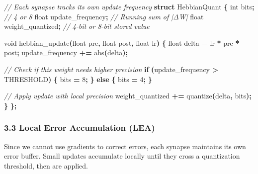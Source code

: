 \documentclass[
  11pt,
  a4paper,
]{article}
\newenvironment{Shaded}{\begin{snugshade}}{\end{snugshade}}
\newcommand{\CommentTok}[1]{\textcolor[rgb]{0.56,0.35,0.01}{\textit{#1}}}
\newcommand{\ControlFlowTok}[1]{\textcolor[rgb]{0.13,0.29,0.53}{\textbf{#1}}}
\newcommand{\DataTypeTok}[1]{\textcolor[rgb]{0.13,0.29,0.53}{#1}}
\newcommand{\DecValTok}[1]{\textcolor[rgb]{0.00,0.00,0.81}{#1}}
\newcommand{\KeywordTok}[1]{\textcolor[rgb]{0.13,0.29,0.53}{\textbf{#1}}}
\newcommand{\NormalTok}[1]{#1}
\newcommand{\OperatorTok}[1]{\textcolor[rgb]{0.81,0.36,0.00}{\textbf{#1}}}
\begin{document}
\begin{Shaded}
\begin{Highlighting}[]
\CommentTok{// Each synapse tracks its own update frequency}
\KeywordTok{struct}\NormalTok{ HebbianQuant }\OperatorTok{\{}
    \DataTypeTok{int}\NormalTok{ bits}\OperatorTok{;}                  \CommentTok{// 4 or 8}
    \DataTypeTok{float}\NormalTok{ update\_frequency}\OperatorTok{;}    \CommentTok{// Running sum of |ΔW|}
    \DataTypeTok{float}\NormalTok{ weight\_quantized}\OperatorTok{;}    \CommentTok{// 4{-}bit or 8{-}bit stored value}
    
    \DataTypeTok{void}\NormalTok{ hebbian\_update}\OperatorTok{(}\DataTypeTok{float}\NormalTok{ pre}\OperatorTok{,} \DataTypeTok{float}\NormalTok{ post}\OperatorTok{,} \DataTypeTok{float}\NormalTok{ lr}\OperatorTok{)} \OperatorTok{\{}
        \DataTypeTok{float}\NormalTok{ delta }\OperatorTok{=}\NormalTok{ lr }\OperatorTok{*}\NormalTok{ pre }\OperatorTok{*}\NormalTok{ post}\OperatorTok{;}
\NormalTok{        update\_frequency }\OperatorTok{+=}\NormalTok{ abs}\OperatorTok{(}\NormalTok{delta}\OperatorTok{);}
        
        \CommentTok{// Check if this weight needs higher precision}
        \ControlFlowTok{if} \OperatorTok{(}\NormalTok{update\_frequency }\OperatorTok{\textgreater{}}\NormalTok{ THRESHOLD}\OperatorTok{)} \OperatorTok{\{}
\NormalTok{            bits }\OperatorTok{=} \DecValTok{8}\OperatorTok{;}
        \OperatorTok{\}} \ControlFlowTok{else} \OperatorTok{\{}
\NormalTok{            bits }\OperatorTok{=} \DecValTok{4}\OperatorTok{;}
        \OperatorTok{\}}
        
        \CommentTok{// Apply update with local precision}
\NormalTok{        weight\_quantized }\OperatorTok{+=}\NormalTok{ quantize}\OperatorTok{(}\NormalTok{delta}\OperatorTok{,}\NormalTok{ bits}\OperatorTok{);}
    \OperatorTok{\}}
\OperatorTok{\};}
\end{Highlighting}
\end{Shaded}

\subsubsection{3.3 Local Error Accumulation
(LEA)}\label{local-error-accumulation-lea}

Since we cannot use gradients to correct errors, each synapse maintains
its own error buffer. Small updates accumulate locally until they cross
a quantization threshold, then are applied.
\end{document}
